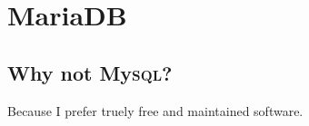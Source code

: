 \section{Maria\textsc{DB}}

\subsection{Why not My\textsc{sql}?} Because I prefer truely free and maintained software.